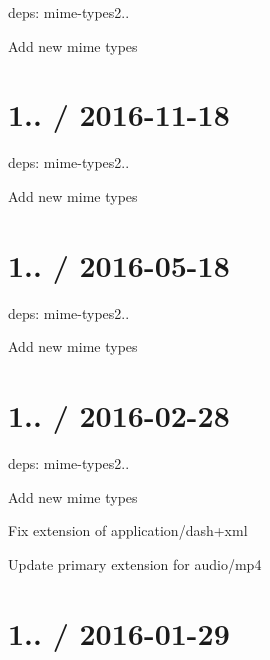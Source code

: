
\begin{DoxyItemize}
\item deps\+: mime-\/types2..
\begin{DoxyItemize}
\item Add new mime types
\end{DoxyItemize}
\end{DoxyItemize}

\section*{1.. / 2016-\/11-\/18 }


\begin{DoxyItemize}
\item deps\+: mime-\/types2..
\begin{DoxyItemize}
\item Add new mime types
\end{DoxyItemize}
\end{DoxyItemize}

\section*{1.. / 2016-\/05-\/18 }


\begin{DoxyItemize}
\item deps\+: mime-\/types2..
\begin{DoxyItemize}
\item Add new mime types
\end{DoxyItemize}
\end{DoxyItemize}

\section*{1.. / 2016-\/02-\/28 }


\begin{DoxyItemize}
\item deps\+: mime-\/types2..
\begin{DoxyItemize}
\item Add new mime types
\item Fix extension of {\ttfamily application/dash+xml}
\item Update primary extension for {\ttfamily audio/mp4}
\end{DoxyItemize}
\end{DoxyItemize}

\section*{1.. / 2016-\/01-\/29 }


